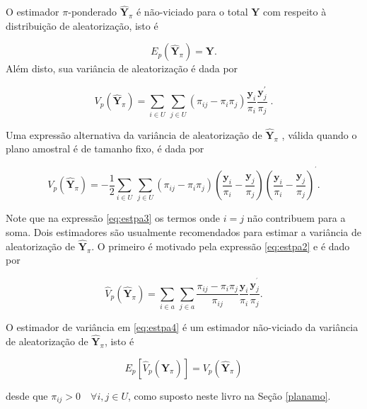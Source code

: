\documentclass[]{book}
\theoremstyle{definition}
\theoremstyle{definition}
\theoremstyle{definition}
\theoremstyle{remark}
\begin{document}
O estimador \(\pi\)-ponderado \(\mathbf{\hat{Y}}_{\pi}\) é não-viciado
para o total \(\mathbf{Y}\) com respeito à distribuição de
aleatorização, isto é

\[
E_p \left( \mathbf{\hat{Y}}_{\pi} \right) = \mathbf{Y} . 
\] Além disto, sua variância de aleatorização é dada por

\begin{equation}
V_p \left( \mathbf{\hat{Y}}_{\pi} \right) = \sum_{ i \in U} \, \sum_{j \in U} \left( \pi _{ij} - \pi_i \pi_j \right) \frac{ \mathbf{y}_i} {\pi_i} \frac{\mathbf{y}_j ^{\prime} } {\pi_j} \; .  \label{eq:estpa2}
\end{equation}

Uma expressão alternativa da variância de aleatorização de
\(\mathbf{\hat{Y}}_{\pi}\) , válida quando o plano amostral é de tamanho
fixo, é dada por

\begin{equation}
V_p \left( \mathbf{\hat{Y}}_{\pi} \right) = -\frac{1}{2} \sum_{i \in U} \, \sum_{j \in U} \left( \pi_{ij} - \pi_i \pi_j \right) \left( \frac{\mathbf{y}_i} {\pi_i} - \frac{\mathbf{y}_j} {\pi_j} \right) \left( \frac{\mathbf{y}_i} {\pi_i} - \frac{\mathbf{y}_j} {\pi_j} \right) ^{^{\prime}}.  \label{eq:estpa3}
\end{equation}

Note que na expressão \eqref{eq:estpa3} os termos onde \(i=j\) não
contribuem para a soma. Dois estimadores são usualmente recomendados
para estimar a variância de aleatorização de \(\mathbf{\hat{Y}}_{\pi}\).
O primeiro é motivado pela expressão \eqref{eq:estpa2} e é dado por

\begin{equation}
\hat{V}_p \left( \mathbf{\hat{Y}}_{\pi} \right) = \sum_{i \in a} \, \sum_{j \in a} \frac{\pi_{ij} - \pi_i \pi_j} {\pi_{ij}} \frac{\mathbf{y}_i} {\pi_i} \frac{\mathbf{y}_j^{^{\prime}}} {\pi_j} \mbox{.}  \label{eq:estpa4}
\end{equation}

O estimador de variância em \eqref{eq:estpa4} é um estimador não-viciado
da variância de aleatorização de \(\mathbf{\hat{Y}}_{\pi}\), isto é

\begin{equation}
E_p \left[ \hat{V}_p \left( \mathbf{\hat{Y}}_{\pi} \right) \right] = V_p \left( \mathbf{\hat{Y}}_{\pi} \right) \label{eq:estpa5}
\end{equation}

desde que \(\pi _{ij} > 0 \quad \forall i,j \in U\), como suposto neste
livro na Seção \ref{planamo}.
\end{document}
